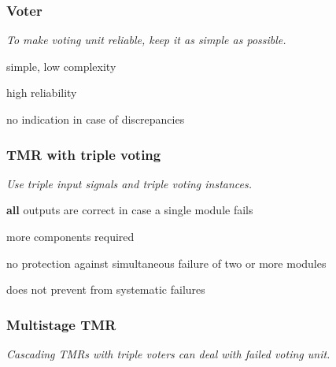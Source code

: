 \documentclass[
  10pt,
  a4paper,
]{article}
\begin{document}
\begin{multicols*}{2}
\subsubsection{Voter}\label{voter}

{\small\textit{To make voting unit reliable, keep it as simple as possible.}}

\begin{center}

\end{center}

{\small\begin{description}[parsep=0mm,labelsep=2pt,labelwidth=10pt]
  \item[\color{OliveGreen}\faPlus] simple, low complexity
  \item[\color{OliveGreen}\faPlus] high reliability
  \item[\color{BrickRed}\faMinus] no indication in case of discrepancies
\end{description}}

\subsubsection{TMR with triple voting}\label{tmr-with-triple-voting}

{\small\textit{Use triple input signals and triple voting instances.}}

\begin{center}

\end{center}

{\small\begin{description}[parsep=0mm,labelsep=2pt,labelwidth=10pt]
  \item[\color{OliveGreen}\faPlus] \textbf{all} outputs are correct in case a single module fails
  \item[\color{BrickRed}\faMinus] more components required
  \item[\color{BrickRed}\faMinus] no protection against simultaneous failure of two or more modules
  \item[\color{BrickRed}\faMinus] does not prevent from systematic failures
\end{description}}

\subsubsection{Multistage TMR}\label{multistage-tmr}

{\small\textit{Cascading TMRs with triple voters can deal with failed voting unit.}}


\end{multicols*}
\end{document}
